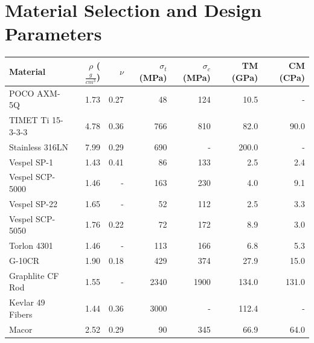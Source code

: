 \documentclass[final]{svjour2}
\begin{document}
\section{Material Selection and Design Parameters}

\begin{table}[htb]%
\begin{threeparttable}
\begin{tabular}{lrrrrrr}
\toprule
\textbf{Material} & $\rho$ ($\frac{g}{cm^3}$) & $\nu$ & $\sigma_{t}$ (MPa) & $\sigma_{c}$ (MPa) & TM (GPa) & CM (CPa) \\
\midrule
 POCO AXM-5Q & 1.73 & 0.27 & 48\tnote{U} & 124\tnote{U} & 10.5 & - \\
 TIMET Ti 15-3-3-3 & 4.78 & 0.36 & 766\tnote{Y} & 810\tnote{Y} & 82.0 & 90.0\\
 Stainless 316LN & 7.99 & 0.29 & 690\tnote{Y} & - & 200.0 & - \\
 Vespel SP-1 & 1.43 & 0.41 & 86 & 133\tnote{*} & 2.5\tnote{\dag} & 2.4 \\
 Vespel SCP-5000 & 1.46 & - & 163 & 230\tnote{*} & 4.0 & 9.1 \\
 Vespel SP-22 & 1.65 & - & 52 & 112\tnote{*} & 2.5 & 3.3 \\
 Vespel SCP-5050 & 1.76 & 0.22 & 72 & 172\tnote{*} & 8.9 & 3.0 \\
 Torlon 4301 & 1.46 & - & 113\tnote{U} & 166\tnote{U} & 6.8 & 5.3 \\
 G-10CR & 1.90 & 0.18 & 429\tnote{U} & 374\tnote{U} & 27.9 & 15.0 \\
 Graphlite CF Rod & 1.55 & -  & 2340 & 1900 & 134.0 & 131.0 \\
 Kevlar 49 Fibers & 1.44 & 0.36 & 3000\tnote{U} & - & 112.4 & - \\
 Macor & 2.52 & 0.29 & 90\tnote{U} & 345\tnote{U} & 66.9 & 64.0 \\


\end{tabular}
\end{threeparttable}
\end{table}
\end{document}
